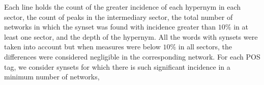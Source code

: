 																																																																																																																																																																																																																																																																																																																																												Each line holds the count of the greater incidence of each hypernym in each sector,
																																																																																																																																																																																																																																																																																																																																												the count of peaks in the intermediary sector, the total number of networks in which the
																																																																																																																																																																																																																																																																																																																																												synset was found with incidence greater than $10\%$ in at least one sector,
																																																																																																																																																																																																																																																																																																																																												and the depth of the hypernym.
																																																																																																																																																																																																																																																																																																																																												All the words with synsets were taken into account but when measures were below $10\%$ in all
																																																																																																																																																																																																																																																																																																																																												sectors, the differences were considered negligible in the corresponding network.
																																																																																																																																																																																																																																																																																																																																												For each POS tag, we consider synsets for which there is such significant incidence in a minimum number of networks,

